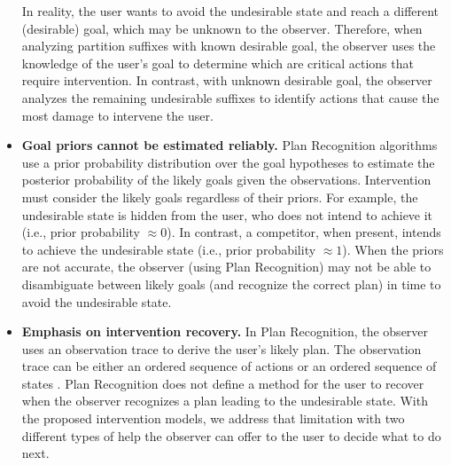 \begin{itemize}
In reality, the user wants to avoid the undesirable state and reach a different (desirable) goal, which may be unknown to the observer.
Therefore, when analyzing partition suffixes with known desirable goal, the observer uses the knowledge of the user's goal to determine which are critical actions that require intervention.   
In contrast, with unknown desirable goal, the observer analyzes the remaining undesirable suffixes to identify actions that cause the most damage to intervene the user.
\item \textbf{Goal priors cannot be estimated reliably.}  
Plan Recognition algorithms use a prior probability distribution over the goal hypotheses to estimate the posterior probability of the likely goals given the observations. 
Intervention must consider the likely goals regardless of their priors. 
For example, the undesirable state is hidden from the user, who does not intend to achieve it (i.e., prior probability $\approx 0$). 
In contrast, a competitor, when present, intends to achieve the undesirable state (i.e., prior probability $\approx 1$).
When the priors are not accurate, the observer (using Plan Recognition) may not be able to  disambiguate between likely goals (and recognize the correct plan) in time to avoid the undesirable state.
  
\item \textbf{Emphasis on intervention recovery.}
In Plan Recognition, the observer uses an observation trace to derive the user's likely plan. 
The observation trace can be either an ordered sequence of actions  \cite{ramirez2009plan,ramirez2010probabilistic} or an ordered sequence of states \cite{sohrabi2016plan}.
Plan Recognition does not define a method for the user to recover when the observer recognizes a plan leading to the undesirable state. 
With the proposed intervention models, we address that limitation with two different types of help the observer can offer to the user to decide what to do next.
\end{itemize}


